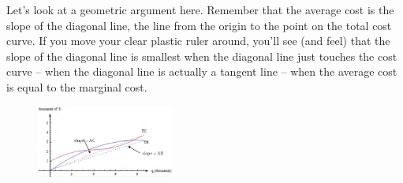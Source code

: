 Let's look at a geometric argument here. Remember that the average cost is the slope of the diagonal line, the line from the origin to the point on the total cost curve. If you move your clear plastic ruler around, you'll see (and feel) that the slope of the diagonal line is smallest when the diagonal line just touches the cost curve -- when the diagonal line is actually a tangent line -- when the average cost is equal to the marginal cost.

\begin{figure}[!ht]
  \centering
    \includegraphics[width=0.4\textwidth]{img/chap3/image113.png}
\end{figure}

